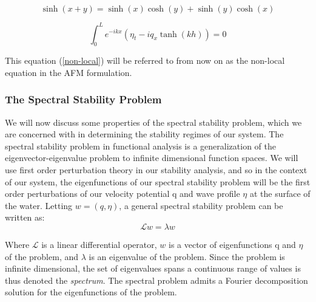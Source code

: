 \documentclass{article}
\begin{document}
\begin{equation} \label{no}
\sinh(x+y) = \sinh(x)\cosh(y) + \sinh(y)\cosh(x) 
\end{equation}


\begin{equation} \label{non-local}
\int_{0}^{L} e^{-ikx}(\eta_{t} - iq_{x}\tanh(kh)) = 0
\end{equation}

\vspace{10}

This equation (\ref{non-local}) will be referred to from now on as the non-local equation in the AFM formulation. \\
\vspace{5}

\subsubsection{The Spectral Stability Problem}

We will now discuss some properties of the spectral stability problem, which we are concerned with in determining the stability regimes of our system. The spectral stability problem in functional analysis is a generalization of the eigenvector-eigenvalue problem to infinite dimensional function spaces. We will use first order perturbation theory in our stability analysis, and so in the context of our system, the eigenfunctions of our spectral stability problem will be the first order perturbations of our velocity potential q and wave profile \(\eta\) at the surface of the water. Letting \(w = (q,\eta)\), a general spectral stability problem can be written as:\\


\begin{equation} \label{specstab}
 \mathscr{L}w = \lambda w
\end{equation}

Where \(\mathscr{L}\) is a linear differential operator, \(w\) is a vector of eigenfunctions q and \(\eta\) of the problem, and \(\lambda\) is an eigenvalue of the problem. Since the problem is infinite dimensional, the set of eigenvalues spans a continuous range of values is thus denoted the \emph{spectrum}. The spectral problem admits a Fourier decomposition solution for the eigenfunctions of the problem. \\

\vspace{15} 
\end{document}
